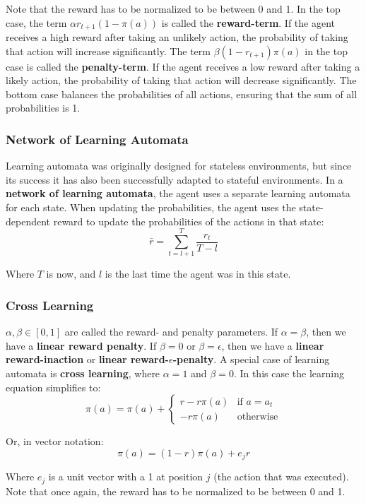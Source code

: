 \documentclass[12pt]{article}
\begin{document}
\noindent
Note that the reward has to be normalized to be between 0 and 1.
In the top case, the term $\alpha r_{t + 1}(1 - \pi(a))$ is called the \textbf{reward-term}.
If the agent receives a high reward after taking an unlikely action, the probability of taking that action will increase significantly.
The term $\beta(1 - r_{t + 1})\pi(a)$ in the top case is called the \textbf{penalty-term}.
If the agent receives a low reward after taking a likely action, the probability of taking that action will decrease significantly.
The bottom case balances the probabilities of all actions, ensuring that the sum of all probabilities is 1.

\subsubsection{Network of Learning Automata}
Learning automata was originally designed for stateless environments, but since its success it has also been successfully adapted to stateful environments.
In a \textbf{network of learning automata}, the agent uses a separate learning automata for each state.
When updating the probabilities, the agent uses the state-dependent reward to update the probabilities of the actions in that state:
\[ \bar{r} = \sum_{t = l + 1}^T \frac{r_t}{T - l} \]

\newpage
\noindent
Where $T$ is now, and $l$ is the last time the agent was in this state.

\subsubsection{Cross Learning}
$\alpha, \beta \in [0, 1]$ are called the reward- and penalty parameters.
If $\alpha = \beta$, then we have a \textbf{linear reward penalty}.
If $\beta = 0$ or $\beta = \epsilon$, then we have a \textbf{linear reward-inaction} or \textbf{linear reward-$\epsilon$-penalty}.
A special case of learning automata is \textbf{cross learning}, where $\alpha = 1$ and $\beta = 0$.
In this case the learning equation simplifies to:
\[ \pi(a) = \pi(a) + \begin{cases}
    r - r \pi(a) & \text{if } a = a_t \\
    -r \pi(a) & \text{otherwise}
\end{cases} \]

\noindent
Or, in vector notation:
\[ \pi(a) = (1 - r)\pi(a) + e_j r \]

\noindent
Where $e_j$ is a unit vector with a 1 at position $j$ (the action that was executed).
Note that once again, the reward has to be normalized to be between 0 and 1.
\end{document}

